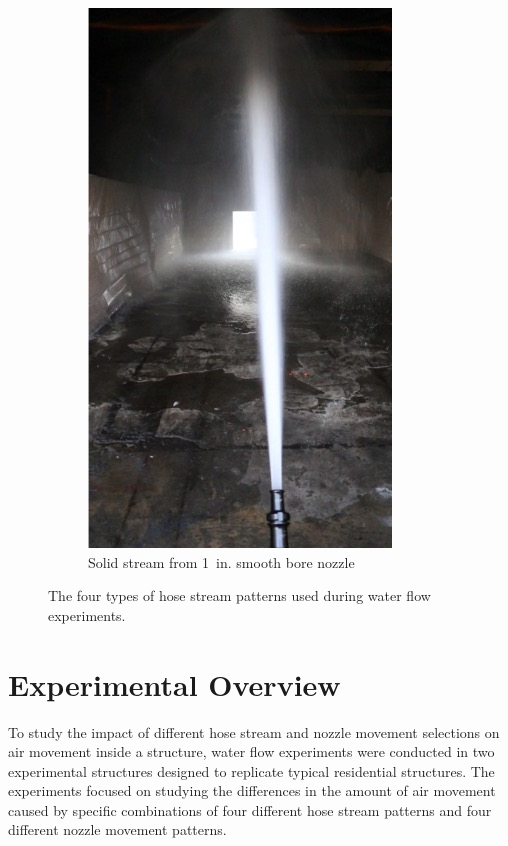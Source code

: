 \documentclass[12pt,oneside]{book}
\begin{document}
\begin{figure}[!ht]
\begin{subfigure}[b]{0.45\columnwidth}
		\includegraphics[width=0.75\columnwidth]{../Figures/Pictures/SB_70}
		\caption{Solid stream from 1~in. smooth bore nozzle}
	\end{subfigure}
	\caption[Hose stream patterns used during experiments.]{The four types of hose stream patterns used during water flow experiments.}
	\label{fig:hose_streams}
\end{figure}

\clearpage

\chapter{Experimental Overview}
\label{chap:exp_overview}
To study the impact of different hose stream and nozzle movement selections on air movement inside a structure, water flow experiments were conducted in two experimental structures designed to replicate typical residential structures. The experiments focused on studying the differences in the amount of air movement caused by specific combinations of four different hose stream patterns and four different nozzle movement patterns.
\end{document}
